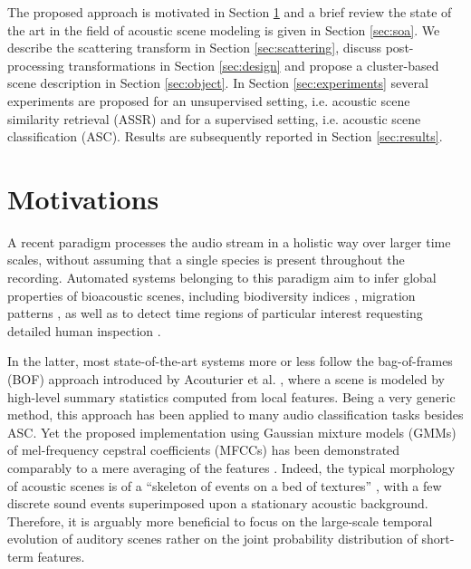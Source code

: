 \documentclass[journal]{IEEEtran}
\makeatletter
\newcommand*{\ie}{i.e.\@\xspace}
\makeatother
\begin{document}
The proposed approach is motivated in Section \ref{sec:motivations} and a brief review the state of the art in the field of acoustic scene modeling is given in Section \ref{sec:soa}. We describe the scattering transform in Section \ref{sec:scattering}, discuss post-processing transformations in Section \ref{sec:design} and propose a cluster-based scene description in Section \ref{sec:object}. In Section \ref{sec:experiments} several experiments are proposed for an unsupervised setting, \ie acoustic scene similarity retrieval (ASSR) and for a supervised setting, \ie acoustic scene classification (ASC). Results are subsequently reported in Section \ref{sec:results}.

\section{Motivations} \label{sec:motivations}


A recent paradigm processes the audio stream in a holistic way over larger time scales, without assuming that a single species is present throughout the recording. Automated systems belonging to this paradigm aim to infer global properties of bioacoustic scenes, including biodiversity indices \cite{Bardeli2010}, migration patterns \cite{Obrist2010}, as well as to detect time regions of particular interest requesting detailed human inspection \cite{rosenstock2002landbird,diefenbach2007incorporating}.

In the latter, most state-of-the-art systems more or less follow the bag-of-frames (BOF) approach introduced by Acouturier et al. \cite{aucouturier2007bag}, where a scene is modeled by high-level summary statistics computed from local features.
Being a very generic method, this approach has been applied to many audio classification tasks besides ASC.
Yet the proposed implementation using Gaussian mixture models (GMMs) of mel-frequency cepstral coefficients (MFCCs) has been demonstrated comparably to a mere averaging of the features \cite{lagrange:hal-01082501}.
Indeed, the typical morphology of acoustic scenes is of a ``skeleton of events on a bed of textures'' \cite{nelken2013}, with a few discrete sound events superimposed upon a stationary acoustic background.
Therefore, it is arguably more beneficial to focus on the large-scale temporal evolution of auditory scenes rather on the joint probability distribution of short-term features.
\end{document}
